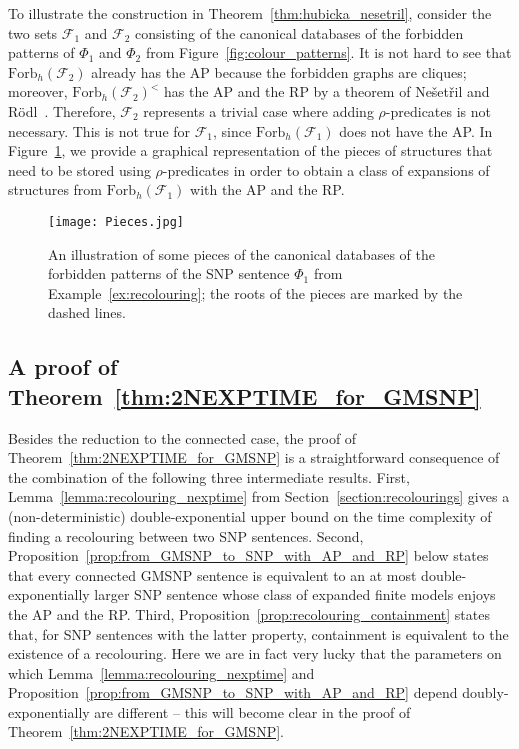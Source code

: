 \documentclass[oneside,reqno,12pt]{amsart}
\theoremstyle{plain}
\theoremstyle{remark}
\newcommand{\Forb}{\ensuremath{\mathrm{Forb}}\xspace}
\begin{document}
{To illustrate the construction in Theorem~\ref{thm:hubicka_nesetril}, consider the two sets $\mathcal{F}_1$ and $\mathcal{F}_2$ consisting of the canonical databases of the forbidden patterns of $\Phi_1$ and $\Phi_2$ from Figure~\ref{fig:colour_patterns}. 
It is not hard to see that $\Forb_{h}(\mathcal{F}_2) $ already has the AP because the forbidden graphs are cliques; moreover, $\Forb_{h}(\mathcal{F}_2)^{<}$ has the AP and the RP by a theorem of Ne\v{s}et\v{r}il and R\"{o}dl~\cite{NESETRIL1983183}.
Therefore, $\mathcal{F}_2$ represents a trivial case where adding $\rho$-predicates is not necessary.
This is not true for $\mathcal{F}_1$, since $\Forb_{h}(\mathcal{F}_1)$ does not have the AP. 
In Figure~\ref{fig:pieces}, we provide a graphical representation of the pieces of structures that need to be stored using $\rho$-predicates in order to obtain a class of expansions of structures from $\Forb_{h}(\mathcal{F}_1)$ with the AP and the RP.


\begin{figure}[ht]
     \centering
      \texttt{[image: Pieces.jpg]}
     \caption{An illustration of some pieces of the canonical databases of the forbidden patterns of the SNP sentence $\Phi_1$ from Example~\ref{ex:recolouring}; the roots of the pieces are marked by the dashed lines.}
     \label{fig:pieces}
 \end{figure} 


\subsection{A proof of Theorem~\ref{thm:2NEXPTIME_for_GMSNP}} 

Besides the reduction to the connected case, the proof of Theorem~\ref{thm:2NEXPTIME_for_GMSNP} is a straightforward consequence of the combination of the following three intermediate results.
First, Lemma~\ref{lemma:recolouring_nexptime} from Section~\ref{section:recolourings} gives a (non-deterministic) double-exponential upper bound on the time complexity of finding a recolouring between two SNP sentences.
Second, Proposition~\ref{prop:from_GMSNP_to_SNP_with_AP_and_RP} below states that every connected GMSNP sentence is equivalent to an at most double-exponentially larger SNP sentence whose class of expanded finite models enjoys the AP and the RP.
Third, Proposition~\ref{prop:recolouring_containment} states that, for SNP sentences with the latter property, containment is equivalent to the existence of a recolouring. 
Here we are in fact very lucky 
that the parameters on which  Lemma~\ref{lemma:recolouring_nexptime} and  Proposition~\ref{prop:from_GMSNP_to_SNP_with_AP_and_RP} depend doubly-exponentially are different -- this will become clear in the proof of Theorem~\ref{thm:2NEXPTIME_for_GMSNP}.




}
\end{document}
